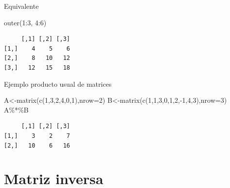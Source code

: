 \documentclass[
  ignorenonframetext,
  aspectratio=169,
  spanish,
]{beamer}
\newenvironment{Shaded}{\begin{snugshade}}{\end{snugshade}}
\newcommand{\AttributeTok}[1]{\textcolor[rgb]{0.40,0.45,0.13}{#1}}
\newcommand{\DecValTok}[1]{\textcolor[rgb]{0.68,0.00,0.00}{#1}}
\newcommand{\FunctionTok}[1]{\textcolor[rgb]{0.28,0.35,0.67}{#1}}
\newcommand{\NormalTok}[1]{\textcolor[rgb]{0.00,0.23,0.31}{#1}}
\newcommand{\OtherTok}[1]{\textcolor[rgb]{0.00,0.23,0.31}{#1}}
\newcommand{\SpecialCharTok}[1]{\textcolor[rgb]{0.37,0.37,0.37}{#1}}
\begin{document}
\begin{frame}[fragile]{Equivalente}
\label{equivalente}
\begin{Shaded}
\begin{Highlighting}[]
\FunctionTok{outer}\NormalTok{(}\DecValTok{1}\SpecialCharTok{:}\DecValTok{3}\NormalTok{, }\DecValTok{4}\SpecialCharTok{:}\DecValTok{6}\NormalTok{)}
\end{Highlighting}
\end{Shaded}

\begin{verbatim}
     [,1] [,2] [,3]
[1,]    4    5    6
[2,]    8   10   12
[3,]   12   15   18
\end{verbatim}
\end{frame}

\begin{frame}[fragile]{Ejemplo producto usual de matrices}
\label{ejemplo-producto-usual-de-matrices}
\begin{Shaded}
\begin{Highlighting}[]
\NormalTok{A}\OtherTok{\textless{}{-}}\FunctionTok{matrix}\NormalTok{(}\FunctionTok{c}\NormalTok{(}\DecValTok{1}\NormalTok{,}\DecValTok{3}\NormalTok{,}\DecValTok{2}\NormalTok{,}\DecValTok{4}\NormalTok{,}\DecValTok{0}\NormalTok{,}\DecValTok{1}\NormalTok{),}\AttributeTok{nrow=}\DecValTok{2}\NormalTok{)}
\NormalTok{B}\OtherTok{\textless{}{-}}\FunctionTok{matrix}\NormalTok{(}\FunctionTok{c}\NormalTok{(}\DecValTok{1}\NormalTok{,}\DecValTok{1}\NormalTok{,}\DecValTok{3}\NormalTok{,}\DecValTok{0}\NormalTok{,}\DecValTok{1}\NormalTok{,}\DecValTok{2}\NormalTok{,}\SpecialCharTok{{-}}\DecValTok{1}\NormalTok{,}\DecValTok{4}\NormalTok{,}\DecValTok{3}\NormalTok{),}\AttributeTok{nrow=}\DecValTok{3}\NormalTok{)}
\NormalTok{A}\SpecialCharTok{\%*\%}\NormalTok{B}
\end{Highlighting}
\end{Shaded}

\begin{verbatim}
     [,1] [,2] [,3]
[1,]    3    2    7
[2,]   10    6   16
\end{verbatim}
\end{frame}

\section{Matriz inversa}\label{matriz-inversa}
\end{document}
